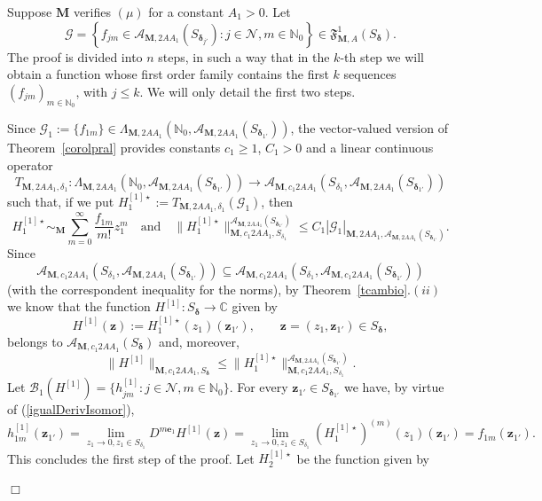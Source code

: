 \documentclass[11pt,a4paper,leqno]{article}
\theoremstyle{plain}
\theoremstyle{definition}
\newenvironment{proof1}{\medskip\par\noindent{\bf Proof}}{\hfill $\Box$
\medskip\par}
\def\C{\mathbb{C}}
\def\N{\mathbb{N}}
\def\bdelta{\boldsymbol{\delta}}
\def\be{\boldsymbol{e}}
\def\bM{\boldsymbol{M}}
\def\bz{\boldsymbol{z}}
\begin{document}
\begin{proof1}
Suppose $\bM$ verifies $(\mu)$ for a constant $A_1>0$. Let
$$\mathcal{G}= \left\{f_{jm}\in\mathcal{A}_{\bM,2AA_{1}}(S_{\bdelta_{j'}}): j\in\mathcal{N},m\in\N_{0}\right\}\in\mathfrak{F}_{\bM,A}^{1}(S_{\bdelta}).
$$
The proof is divided into $n$ steps, in such a way that in the $k$-th step we will obtain a function whose first order family contains the first $k$ sequences $(f_{jm})_{m\in\N_0}$, with $j\le k$.
We will only detail the first two steps.\par
Since $\mathcal{G}_{1}:=\{f_{1m}\}\in \Lambda_{\bM,2AA_1}\left(\N_0,\mathcal{A}_{\bM,2AA_1}(S_{\bdelta_{1'}})\right)$,
the vector-valued version of Theorem~\ref{corolpral} provides
constants $c_{1}\ge 1$, $C_{1}>0$ and a linear continuous operator
$$
T_{\bM,2AA_{1},\delta_{1}}: \Lambda_{\bM,2AA_{1}}(\N_0,\mathcal{A}_{\bM,2AA_{1}}(S_{\bdelta_{1'}})) \longrightarrow \mathcal{A}_{\bM,c_{1}2AA_{1}}(S_{\delta_{1}}, \mathcal{A}_{\bM,2AA_{1}}(S_{\bdelta_{1'}}))
$$
such that, if we put $H_{1}^{[1]\star}:=T_{\bM,2AA_{1},\delta_{1}}(\mathcal{G}_{1})$, then
$$
H_{1}^{[1]\star}\sim_{\bM}\sum_{m=0}^{\infty}\frac{f_{1m}}{m!}z_{1}^{m}\quad\textrm{and}\quad \|H_{1}^{[1]\star}\|_{\bM,c_{1}2AA_{1},S_{\delta_{1}}}^{\mathcal{A}_{\bM,2AA_{1}}(S_{\bdelta_{1'}})} \le C_{1}|\mathcal{G}_{1}|_{\bM,2AA_{1},\mathcal{A}_{\bM,2AA_{1}}(S_{\bdelta_{1'}})}.
$$
Since
$$
\mathcal{A}_{\bM,c_{1}2AA_{1}}(S_{\delta_{1}},\mathcal{A}_{\bM,2AA_{1}}(S_{\bdelta_{1'}}))\subseteq
\mathcal{A}_{\bM,c_{1}2AA_{1}}(S_{\delta_{1}},\mathcal{A}_{\bM,c_{1}2AA_{1}}(S_{\bdelta_{1'}}))
$$
(with the correspondent inequality for the norms), by Theorem~\ref{tcambio}.$(ii)$
we know that the function $H^{[1]}:S_{\bdelta}\to \C$ given by
$$H^{[1]}(\bz):=H_1^{[1]\star}(z_{1})(\bz_{1'}),\qquad \bz=(z_1,\bz_{1'})\in S_{\bdelta},
$$
belongs to $\mathcal{A}_{\bM,c_{1}2AA_{1}}(S_{\bdelta})$ and, moreover,
$$
\|H^{[1]}\|_{\bM,c_{1}2AA_{1},S_{\bdelta}}\le \|H^{[1]\star}_{1}\|_{\bM,c_{1}2AA_{1},S_{\delta_{1}}}^{\mathcal{A}_{\bM,2AA_{1}}(S_{\bdelta_{1'}})}.
$$
Let $\mathcal{B}_{1}(H^{[1]})=\{h_{jm}^{[1]}:j\in \mathcal{N},m\in\N_{0}\}$. For every $\bz_{1'}\in S_{\bdelta_{1'}}$ we have, by virtue of (\ref{igualDerivIsomor}),
$$
h_{1m}^{[1]}(\bz_{1'})=\lim_{z_{1}\to 0,z_{1}\in S_{\delta_{1}}}D^{m\be_{1}}H^{[1]}(\bz)= \lim_{z_{1}\to 0,z_{1}\in S_{\delta_{1}}}(H^{[1]\star}_{1})^{(m)}(z_{1})(\bz_{1'})=f_{1m}(\bz_{1'}).
$$
This concludes the first step of the proof. Let $H_{2}^{[1]\star}$ be the function given by

\end{proof1}
\end{document}
